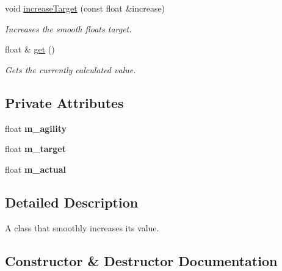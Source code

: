 \begin{DoxyCompactItemize}
void \hyperlink{classflounder_1_1smoothfloat_a47a9df312c81c9a9c8f5bc8df3b886a1}{increase\+Target} (const float \&increase)
\begin{DoxyCompactList}\small\item\em Increases the smooth floats target. \end{DoxyCompactList}\item 
float \& \hyperlink{classflounder_1_1smoothfloat_a3c69b87e7702a644c3d5f1cca646206e}{get} ()
\begin{DoxyCompactList}\small\item\em Gets the currently calculated value. \end{DoxyCompactList}\end{DoxyCompactItemize}
\subsection*{Private Attributes}
\begin{DoxyCompactItemize}
\item 
\mbox{\label{classflounder_1_1smoothfloat_a12c7af68c4593ac56937a67a361ff68c}} 
float {\bfseries m\+\_\+agility}
\item 
\mbox{\label{classflounder_1_1smoothfloat_a93282a9c33a29a59439f0f15732b8616}} 
float {\bfseries m\+\_\+target}
\item 
\mbox{\label{classflounder_1_1smoothfloat_a4f912b967036d670c447dfd61ec10194}} 
float {\bfseries m\+\_\+actual}
\end{DoxyCompactItemize}


\subsection{Detailed Description}
A class that smoothly increases its value. 



\subsection{Constructor \& Destructor Documentation}
\mbox{\label{classflounder_1_1smoothfloat_a4a893f989019e779fa377f6ef5576121}} 
